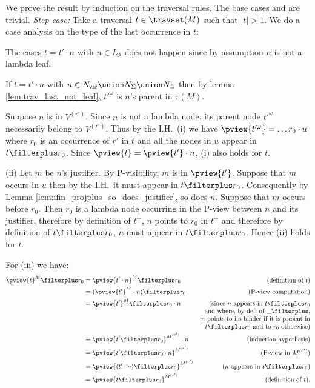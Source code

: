 We prove the result by induction on the traversal rules. The base cases  and
 are trivial. \emph{Step case:} Take a traversal $t
\in \travset(M)$ such that $|t|>1$. We do a case analysis on the type of the last occurrence in $t$:
    \begin{compactitem}
    \item The cases $t = t' \cdot n$ with $n\in L_\lambda$ does not happen since by assumption $n$ is not a
    lambda leaf.

    \item If $t = t' \cdot n$ with $n \in N_{\sf var} \union
    N_\Sigma \union N_@$ then by lemma
    \ref{lem:trav_last_not_leaf}, $t'^\omega$ is $n$'s
    parent in $\tau(M)$.

    Suppose $n$ is in $V^{(r')}$. Since $n$ is not a lambda
    node, its parent node $t'^\omega$ necessarily belong to
    $V^{(r')}$. Thus by the I.H.\ (i) we have
    $\pview{t'^\omega} = \ldots r_0 \cdot u$ where $r_0$ is
    an occurrence of $r'$ in $t$ and all the nodes in
    $u$ appear in $t\filterplus r_0$.
    Since $\pview{t} = \pview{t'} \cdot n$, (i) also holds for $t$.

    (ii) Let $m$ be $n$'s justifier. By P-visibility, $m$ is in $\pview{t'}$.
    Suppose that $m$ occurs in $u$ then by the I.H.\ it must appear in $t\filterplus r_0$. Consequently by Lemma \ref{lem:ifin_projplus_so_does_justifier}, so does $n$.
    Suppose that $m$ occurs before $r_0$. Then $r_0$ is a lambda node occurring in the P-view between $n$ and its justifier, therefore
    by definition of $t^+$, $n$ points to $r_0$ in $t^+$ and therefore by definition of $t\filterplus  r_0$,
    $n$ must appear in $t\filterplus r_0$. Hence (ii) holds for $t$.

    For (iii) we have:
        \begin{align*}
        \pview{t}^M \filterplus r_0
    &= \pview{t' \cdot n}^M \filterplus r_0 & (\mbox{definition of } t)\\
            &= (\pview{t'}^M \cdot n) \filterplus r_0  & (\mbox{P-view computation}) \\
            &= \pview{t'}^M \filterplus r_0  \cdot n             & \parbox[t]{6cm}{(\raggedleft since $n$ appears in $t\filterplus r_0$ and where,
             by def.\ of $\_ \filterplus$,  $n$ points to its binder if it is present in $t\filterplus r_0$ and to
             $r_0$ otherwise)} \\
            &= \pview{t' \filterplus  r_0 }^{M^{(r')}} \cdot n            & (\mbox{induction hypothesis}) \\
            &= \pview{t' \filterplus  r_0 \cdot n }^{M^{(r')}} & (\mbox{P-view in $M^{(r')}$}) \\
            &= \pview{(t' \cdot n ) \filterplus  r_0  }^{M^{(r')}}           & (\mbox{$n$ appears in $t\filterplus r_0$}) \\
            &= \pview{t \filterplus  r_0  }^{M^{(r')}}
     & (\mbox{definition of } t).
        \end{align*}


\end{compactitem}
